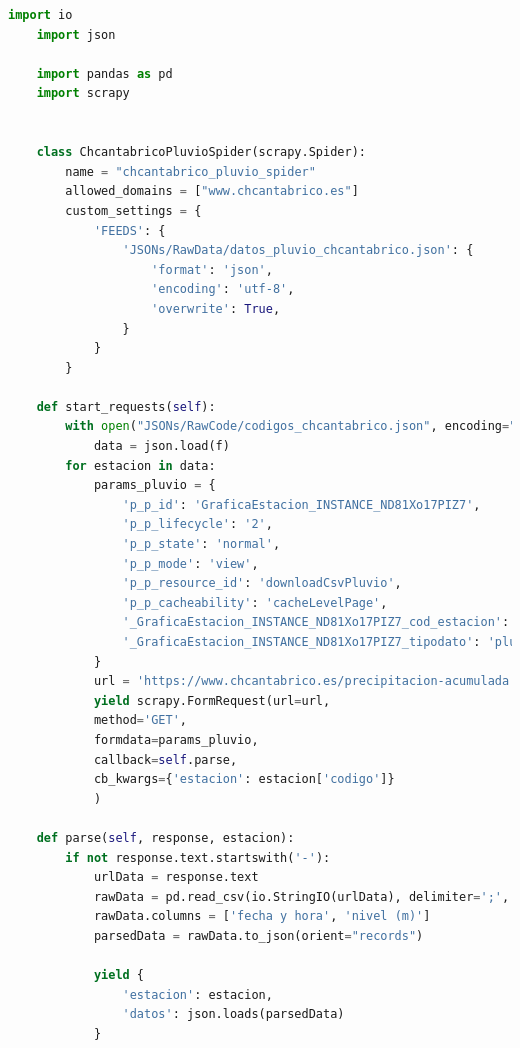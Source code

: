 \begin{lstlisting}[language=Python, caption={Pluviometric Spider}]
	import io
	import json
	
	import pandas as pd
	import scrapy
	
	
	class ChcantabricoPluvioSpider(scrapy.Spider):
		name = "chcantabrico_pluvio_spider"
		allowed_domains = ["www.chcantabrico.es"]
		custom_settings = {
			'FEEDS': {
				'JSONs/RawData/datos_pluvio_chcantabrico.json': {
					'format': 'json',
					'encoding': 'utf-8',
					'overwrite': True,
				}
			}
		}
	
	def start_requests(self):
		with open("JSONs/RawCode/codigos_chcantabrico.json", encoding="utf-8") as f:
			data = json.load(f)
		for estacion in data:
			params_pluvio = {
				'p_p_id': 'GraficaEstacion_INSTANCE_ND81Xo17PIZ7',
				'p_p_lifecycle': '2',
				'p_p_state': 'normal',
				'p_p_mode': 'view',
				'p_p_resource_id': 'downloadCsvPluvio',
				'p_p_cacheability': 'cacheLevelPage',
				'_GraficaEstacion_INSTANCE_ND81Xo17PIZ7_cod_estacion': f'{estacion["codigo"]}',
				'_GraficaEstacion_INSTANCE_ND81Xo17PIZ7_tipodato': 'pluvio',
			}
			url = 'https://www.chcantabrico.es/precipitacion-acumulada'
			yield scrapy.FormRequest(url=url,
			method='GET',
			formdata=params_pluvio,
			callback=self.parse,
			cb_kwargs={'estacion': estacion['codigo']}
			)
	
	def parse(self, response, estacion):
		if not response.text.startswith('-'):
			urlData = response.text
			rawData = pd.read_csv(io.StringIO(urlData), delimiter=';', encoding='utf-8', header=1)
			rawData.columns = ['fecha y hora', 'nivel (m)']
			parsedData = rawData.to_json(orient="records")
			
			yield {
				'estacion': estacion,
				'datos': json.loads(parsedData)
			}
\end{lstlisting}

